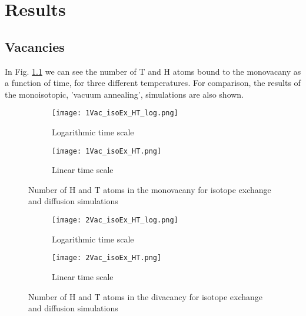 \chapter{Results}

\section{Vacancies}
In Fig. \ref{Fig:1Vac_results} we can see the number of T and H atoms bound to the monovacany as a function of time, for three different temperatures. 
For comparison, the results of the monoisotopic, 'vacuum annealing', simulations are also shown. 

\begin{figure}[ht]
\begin{subfigure}{.5\textwidth}
  \centering
  \texttt{[image: 1Vac\_isoEx\_HT\_log.png]}  
  \caption{Logarithmic time scale}
\end{subfigure}
\begin{subfigure}{.5\textwidth}
  \centering
  \texttt{[image: 1Vac\_isoEx\_HT.png]}  
  \caption{Linear time scale}
\end{subfigure}
\caption{Number of H and T atoms in the monovacany for isotope exchange and diffusion simulations}
 \label{Fig:1Vac_results} 
\end{figure}


\begin{figure}[ht]
\begin{subfigure}{.5\textwidth}
  \centering
 \texttt{[image: 2Vac\_isoEx\_HT\_log.png]}  
  \caption{Logarithmic time scale}
\end{subfigure}
\begin{subfigure}{.5\textwidth}
  \centering
  \texttt{[image: 2Vac\_isoEx\_HT.png]}  
  \caption{Linear time scale}
\end{subfigure}
   \caption{Number of H and T atoms in the divacancy for isotope exchange and diffusion simulations}
   \label{Fig:2Vac_results} 
\end{figure}

